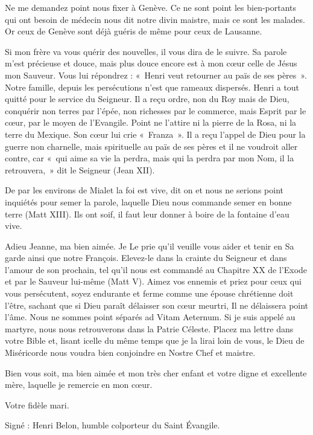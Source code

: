 {Ne me demandez point nous fixer à Genève. Ce ne sont point les bien-portants qui ont besoin de médecin nous dit notre divin maistre, mais ce sont les malades. Or ceux de Genève sont déjà guéris de même pour ceux de Lausanne.

Si mon frère va vous quérir des nouvelles, il vous dira de le suivre. Sa parole m’est précieuse et douce, mais plus douce encore est à mon cœur celle de Jésus mon Sauveur. Vous lui répondrez : «~Henri veut retourner au païs de ses pères~». Notre famille, depuis les persécutions n’est que rameaux dispersés. Henri a tout quitté pour le service du Seigneur. Il a reçu ordre, non du Roy mais de Dieu, conquérir non terres par l’épée, non richesses par le commerce, mais Esprit par le cœur, par le moyen de l’Evangile. Point ne l’attire ni la pierre de la Rosa, ni la terre du Mexique. Son cœur lui crie «~Franza~». Il a reçu l’appel de Dieu pour la guerre non charnelle, mais spirituelle au païs de ses pères et il ne voudroit aller contre, car «~qui aime sa vie la perdra, mais qui la perdra par mon Nom, il la retrouvera,~» dit le Seigneur (Jean XII).

De par les environs de Mialet la foi est vive, dit on et nous ne serions point inquiétés pour semer la parole, laquelle Dieu nous commande semer en bonne terre (Matt XIII). Ils ont soif, il faut leur donner à boire de la fontaine d’eau vive.

Adieu Jeanne, ma bien aimée. Je Le prie qu’il veuille vous aider et tenir en Sa garde ainsi que notre François. Elevez-le dans la crainte du Seigneur et dans l’amour de son prochain, tel qu’il nous est commandé au Chapitre XX de l’Exode et par le Sauveur lui-même (Matt V). Aimez vos ennemis et priez pour ceux qui vous persécutent, soyez endurante et ferme comme une épouse chrétienne doit l’être, sachant que si Dieu paraît délaisser son cœur meurtri, Il ne délaissera point l’âme. Nous ne sommes point séparés ad Vitam Aeternum. Si je suis appelé au martyre, nous nous retrouverons dans la Patrie Céleste. Placez ma lettre dans votre Bible et, lisant icelle du même temps que je la lirai loin de vous, le Dieu de Miséricorde nous voudra bien conjoindre en Nostre Chef et maistre.

Bien vous soit, ma bien aimée et mon très cher enfant et votre digne et excellente mère, laquelle je remercie en mon cœur.

\begin{center}
Votre fidèle mari.
\end{center}

Signé : Henri Belon, humble colporteur du Saint Évangile.

}
